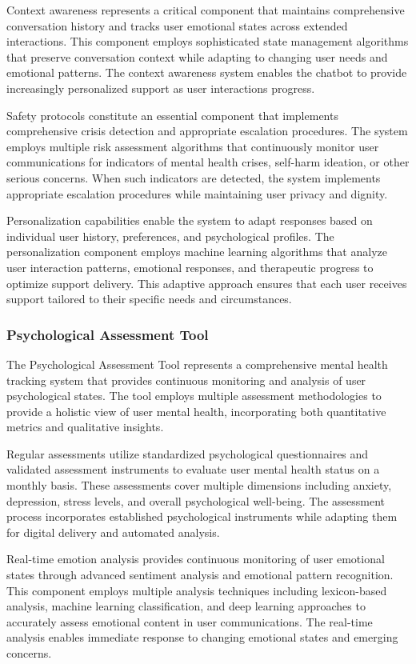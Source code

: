 Context awareness represents a critical component that maintains comprehensive conversation history and tracks user emotional states across extended interactions. This component employs sophisticated state management algorithms that preserve conversation context while adapting to changing user needs and emotional patterns. The context awareness system enables the chatbot to provide increasingly personalized support as user interactions progress.

Safety protocols constitute an essential component that implements comprehensive crisis detection and appropriate escalation procedures. The system employs multiple risk assessment algorithms that continuously monitor user communications for indicators of mental health crises, self-harm ideation, or other serious concerns. When such indicators are detected, the system implements appropriate escalation procedures while maintaining user privacy and dignity.

Personalization capabilities enable the system to adapt responses based on individual user history, preferences, and psychological profiles. The personalization component employs machine learning algorithms that analyze user interaction patterns, emotional responses, and therapeutic progress to optimize support delivery. This adaptive approach ensures that each user receives support tailored to their specific needs and circumstances.

\subsubsection{Psychological Assessment Tool}

The Psychological Assessment Tool represents a comprehensive mental health tracking system that provides continuous monitoring and analysis of user psychological states. The tool employs multiple assessment methodologies to provide a holistic view of user mental health, incorporating both quantitative metrics and qualitative insights.

Regular assessments utilize standardized psychological questionnaires and validated assessment instruments to evaluate user mental health status on a monthly basis. These assessments cover multiple dimensions including anxiety, depression, stress levels, and overall psychological well-being. The assessment process incorporates established psychological instruments while adapting them for digital delivery and automated analysis.

Real-time emotion analysis provides continuous monitoring of user emotional states through advanced sentiment analysis and emotional pattern recognition. This component employs multiple analysis techniques including lexicon-based analysis, machine learning classification, and deep learning approaches to accurately assess emotional content in user communications. The real-time analysis enables immediate response to changing emotional states and emerging concerns.

